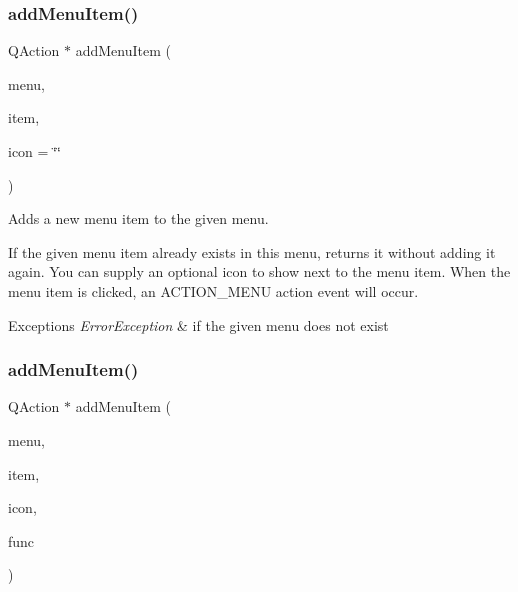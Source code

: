 \subsubsection{\texorpdfstring{add\+Menu\+Item()}{addMenuItem()}\hspace{0.1cm}{\footnotesize\ttfamily [1/4]}}
{\footnotesize\ttfamily Q\+Action $\ast$ add\+Menu\+Item (\begin{DoxyParamCaption}\item[{const std\+::string \&}]{menu,  }\item[{const std\+::string \&}]{item,  }\item[{const std\+::string \&}]{icon = {\ttfamily \char`\"{}\char`\"{}} }\end{DoxyParamCaption})\hspace{0.3cm}{\ttfamily [virtual]}}



Adds a new menu item to the given menu. 

If the given menu item already exists in this menu, returns it without adding it again. You can supply an optional icon to show next to the menu item. When the menu item is clicked, an A\+C\+T\+I\+O\+N\+\_\+\+M\+E\+NU action event will occur. 
\begin{DoxyExceptions}{Exceptions}
{\em Error\+Exception} & if the given menu does not exist \\
\hline
\end{DoxyExceptions}
\mbox{\label{classsgl_1_1GWindow_ad57e2955efbfb5a0cccc981332945c8e}} 
\subsubsection{\texorpdfstring{add\+Menu\+Item()}{addMenuItem()}\hspace{0.1cm}{\footnotesize\ttfamily [2/4]}}
{\footnotesize\ttfamily Q\+Action $\ast$ add\+Menu\+Item (\begin{DoxyParamCaption}\item[{const std\+::string \&}]{menu,  }\item[{const std\+::string \&}]{item,  }\item[{const std\+::string \&}]{icon,  }\item[{\mbox{\hyperlink{namespacesgl_a54427ce97bb1c2804e4fe2b0a62e8b17}{G\+Event\+Listener\+Void}}}]{func }\end{DoxyParamCaption})\hspace{0.3cm}{\ttfamily [virtual]}}



